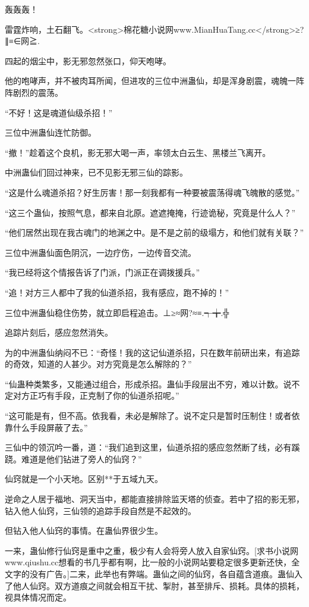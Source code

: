 
\begin{this_body}

轰轰轰！

雷霆炸响，土石翻飞。<strong>棉花糖小说网www.MianHuaTang.cc</strong>≥?∥≡∈网≧.

四起的烟尘中，影无邪忽然张口，仰天咆哮。

他的咆哮声，并不被肉耳所闻，但进攻的三位中洲蛊仙，却是浑身剧震，魂魄一阵阵剧烈的震荡。

“不好！这是魂道仙级杀招！”

三位中洲蛊仙连忙防御。

“撤！”趁着这个良机，影无邪大喝一声，率领太白云生、黑楼兰飞离开。

中洲蛊仙们回过神来，已不见影无邪三仙的踪影。

“这是什么魂道杀招？好生厉害！那一刻我都有一种要被震荡得魂飞魄散的感觉。”

“这三个蛊仙，按照气息，都来自北原。遮遮掩掩，行迹诡秘，究竟是什么人？”

“他们居然出现在我古魂门的地渊之中。是不是之前的级塌方，和他们就有关联？”

三位中洲蛊仙面色阴沉，一边疗伤，一边传音交流。

“我已经将这个情报告诉了门派，门派正在调拨援兵。”

“追！对方三人都中了我的仙道杀招，我有感应，跑不掉的！”

三位中洲蛊仙稳住伤势，就立即启程追击。⊥≥≈网?≈≡.┭╈.╬

追踪片刻后，感应忽然消失。

为的中洲蛊仙纳闷不已：“奇怪！我的这记仙道杀招，只在数年前研出来，有追踪的奇效，知道的人甚少。对方究竟是怎么解除的？”

“仙蛊种类繁多，又能通过组合，形成杀招。蛊仙手段层出不穷，难以计数。说不定对方正巧有手段，正克制了你的仙道杀招呢。”

“这可能是有，但不高。依我看，未必是解除了。说不定只是暂时压制住！或者依靠什么手段屏蔽了去。”

三仙中的领沉吟一番，道：“我们追到这里，仙道杀招的感应忽然断了线，必有蹊跷。难道是他们钻进了旁人的仙窍？”

仙窍就是一个小天地。区别**于五域九天。

逆命之人居于福地、洞天当中，都能直接排除监天塔的侦查。若中了招的影无邪，钻入他人仙窍，三仙领的追踪手段自然是不起效的。

但钻入他人仙窍的事情。在蛊仙界很少生。

一来，蛊仙修行仙窍是重中之重，极少有人会将旁人放入自家仙窍。[求书小说网www.qiushu.cc想看的书几乎都有啊，比一般的小说网站要稳定很多更新还快，全文字的没有广告。]二来，此举也有弊端。蛊仙之间的仙窍，各自蕴含道痕。蛊仙入了他人仙窍。双方道痕之间就会相互干扰、掣肘，甚至排斥、损耗。具体的损耗，视具体情况而定。


\end{this_body}
